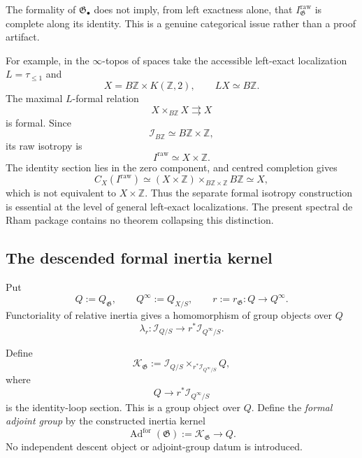 \begin{remark}
\label{rem:raw-formal-isotropy-distinct}
The formality of $\mathfrak G_\bullet$ does not imply, from left exactness
alone, that $I^{\mathrm{raw}}_{\mathfrak G}$ is complete along its identity.
This is a genuine categorical issue rather than a proof artifact.

For example, in the $\infty$-topos of spaces take the accessible left-exact
localization $L=\tau_{\le1}$ and
\[
    X=B\mathbb Z\times K(\mathbb Z,2),
    \qquad
    LX\simeq B\mathbb Z.
\]
The maximal $L$-formal relation
\[
    X\times_{B\mathbb Z}X\rightrightarrows X
\]
is formal.  Since
\[
    \mathcal I_{B\mathbb Z}
    \simeq
    B\mathbb Z\times\mathbb Z,
\]
its raw isotropy is
\[
    I^{\mathrm{raw}}
    \simeq
    X\times\mathbb Z.
\]
The identity section lies in the zero component, and centred completion gives
\[
    C_X(I^{\mathrm{raw}})
    \simeq
    (X\times\mathbb Z)
    \times_{B\mathbb Z\times\mathbb Z}
    B\mathbb Z
    \simeq X,
\]
which is not equivalent to $X\times\mathbb Z$.  Thus the separate formal
isotropy construction is essential at the level of general left-exact
localizations.  The present spectral de Rham package contains no theorem collapsing this
distinction.
\end{remark}

\subsection{The descended formal inertia kernel}

Put
\[
    Q:=Q_{\mathfrak G},
    \qquad
    Q^\infty:=Q_{X/S},
    \qquad
    r:=r_{\mathfrak G}:Q\to Q^\infty.
\]
Functoriality of relative inertia gives a homomorphism of group objects over
$Q$
\[
    \lambda_r:
    \mathcal I_{Q/S}
    \longrightarrow
    r^*\mathcal I_{Q^\infty/S}.
\]

\begin{definition}
\label{def:formal-inertia-kernel}
Define
\[
    \mathcal K_{\mathfrak G}
    :=
    \mathcal I_{Q/S}
    \times_{r^*\mathcal I_{Q^\infty/S}}
    Q,
\]
where
\[
    Q\longrightarrow r^*\mathcal I_{Q^\infty/S}
\]
is the identity-loop section.  This is a group object over $Q$.  Define the
\emph{formal adjoint group} by the constructed inertia kernel
\[
    \operatorname{Ad}^{\mathrm{for}}(\mathfrak G)
    :=
    \mathcal K_{\mathfrak G}
    \longrightarrow Q.
\]
No independent descent object or adjoint-group datum is introduced.
\end{definition}

